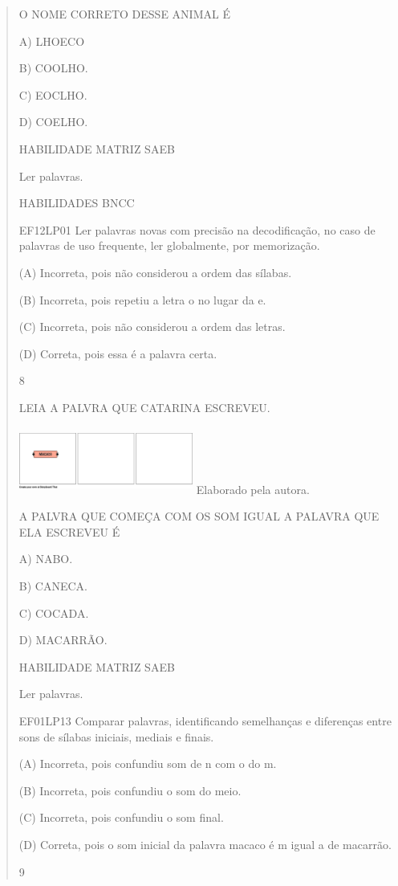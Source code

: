 \begin{escola}
{\begin{verse}
O NOME CORRETO DESSE ANIMAL É

A) LHOECO

B) COOLHO.

C) EOCLHO.

D) COELHO.

HABILIDADE MATRIZ SAEB

Ler palavras.

HABILIDADES BNCC

EF12LP01 Ler palavras novas com precisão na decodificação, no caso de
palavras de uso frequente, ler globalmente, por memorização.

(A) Incorreta, pois não considerou a ordem das sílabas.

(B) Incorreta, pois repetiu a letra o no lugar da e.

(C) Incorreta, pois não considerou a ordem das letras.

(D) Correta, pois essa é a palavra
certa.\protect\hypertarget{_heading=h.9bc4fu3nu5it}{}{}

\num{8}

LEIA A PALVRA QUE CATARINA ESCREVEU.

\includegraphics[width=2.25361in,height=0.86599in]{media/image247.png}
Elaborado pela autora.

A PALVRA QUE COMEÇA COM OS SOM IGUAL A PALAVRA QUE ELA ESCREVEU É

A) NABO.

B) CANECA.

C) COCADA.

D) MACARRÃO.

HABILIDADE MATRIZ SAEB

Ler palavras.

EF01LP13 Comparar palavras, identificando semelhanças e diferenças entre
sons de sílabas iniciais, mediais e finais.

(A) Incorreta, pois confundiu som de n com o do m.

(B) Incorreta, pois confundiu o som do meio.

(C) Incorreta, pois confundiu o som final.

(D) Correta, pois o som inicial da palavra macaco é m igual a de
macarrão.\protect\hypertarget{_heading=h.z3c8l2ojus6u}{}{}

\num{9}


\end{verse}}
\end{escola}
